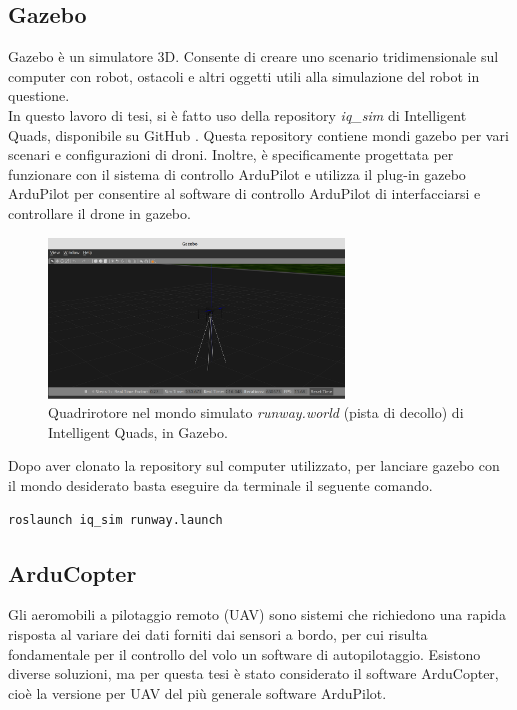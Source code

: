 \subsection{Gazebo}
Gazebo è un simulatore 3D. Consente di creare uno scenario tridimensionale sul computer con robot, ostacoli e altri oggetti utili alla simulazione del robot in questione.\\

In questo lavoro di tesi, si è fatto uso della repository \emph{iq\_sim} di Intelligent Quads, disponibile su GitHub \cite{iqSIM}. Questa repository contiene mondi gazebo per vari scenari e configurazioni di droni. Inoltre, è specificamente progettata per funzionare con il sistema di controllo ArduPilot e utilizza il plug-in gazebo ArduPilot per consentire al software di controllo ArduPilot di interfacciarsi e controllare il drone in gazebo.

\begin{figure}[H]
	\centering
	\includegraphics[width=0.7\textwidth]{gfx/ROS/gazebo_new}
	\caption[Quadrirotore nel mondo simulato.]{Quadrirotore nel mondo simulato \emph{runway.world} (pista di decollo) di Intelligent Quads, in Gazebo.}
	\label{fig:gazebo}
\end{figure}

Dopo aver clonato la repository sul computer utilizzato, per lanciare gazebo con il mondo desiderato basta eseguire da terminale il seguente comando.\\

\begin{lstlisting}[language=bash]
  roslaunch iq_sim runway.launch
\end{lstlisting}

\subsection{ArduCopter}
Gli aeromobili a pilotaggio remoto (\acs{UAV}) sono sistemi che richiedono una rapida risposta al variare dei dati forniti dai sensori a bordo, per cui risulta fondamentale per il controllo del volo un software di autopilotaggio. Esistono diverse soluzioni, ma per questa tesi è stato considerato il software ArduCopter, cioè la versione per \acs{UAV} del più generale software ArduPilot.\\

